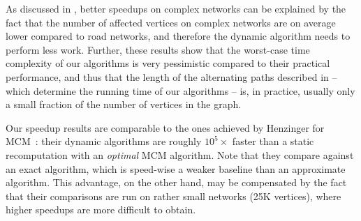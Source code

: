 As discussed in , better speedups on
complex networks can be explained by the fact that the number of affected
vertices on complex networks are on average lower compared to road networks,
and therefore the dynamic algorithm needs to perform less work.
Further, these results show that the worst-case time complexity
of our algorithms is very pessimistic compared to their practical performance,
and thus that the length of the alternating paths described in
 -- which determine the running time of our
algorithms -- is, in practice, usually only a small fraction of the number of
vertices in the graph.

Our speedup results are comparable to the ones achieved by Henzinger \etal for
MCM~\cite{DBLP:conf/esa/Henzinger0P020}: their dynamic algorithms are roughly
$10^5\times$ faster than a static recomputation with an \emph{optimal} MCM
algorithm. Note that they compare against an exact algorithm, which is
speed-wise a weaker baseline than an approximate algorithm. This advantage, on
the other hand, may be compensated by the fact that their comparisons are run
on rather small networks (25K vertices), where higher speedups are more
difficult to obtain.

